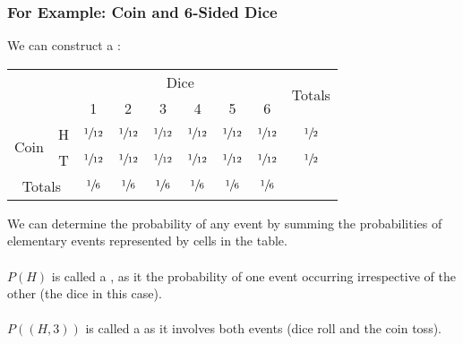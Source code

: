 \documentclass{report}
\begin{document}
            \subsubsection*{For Example: Coin and 6-Sided Dice}
                We can construct a :
                \begin{center}
                    \begin{tabular}{c c c c c c c c c}
                        \setlength{\tabcolsep}{3em}
                        & & \multicolumn{6}{c}{Dice} & \multirow{2}{*}{Totals} \\
                                            &     & 1               & 2               & 3               & 4               & 5               & 6              \\
                        \multirow{2}{*}{Coin} & H   & $\sfrac{1}{12}$ & $\sfrac{1}{12}$ & $\sfrac{1}{12}$ & $\sfrac{1}{12}$ & $\sfrac{1}{12}$ &$\sfrac{1}{12}$ & $\sfrac{1}{2}$ \\
                                            & T   & $\sfrac{1}{12}$ & $\sfrac{1}{12}$ & $\sfrac{1}{12}$ & $\sfrac{1}{12}$ & $\sfrac{1}{12}$ &$\sfrac{1}{12}$ & $\sfrac{1}{2}$ \\
                        \multicolumn{2}{c}{Totals} & $\sfrac{1}{6}$  & $\sfrac{1}{6}$  & $\sfrac{1}{6}$  & $\sfrac{1}{6}$  & $\sfrac{1}{6}$  & $\sfrac{1}{6}$ &                \\
                    \end{tabular}
                \end{center}
                We can determine the probability of any event by summing the probabilities of elementary events represented by cells in the table.
                \\
                \\ $P({H})$ is called a , as it the probability of one event occurring irrespective of the other (the dice in this case).
                \\
                \\ $P({(H,3)})$ is called a  as it involves both events (dice roll and the coin toss).
\end{document}
